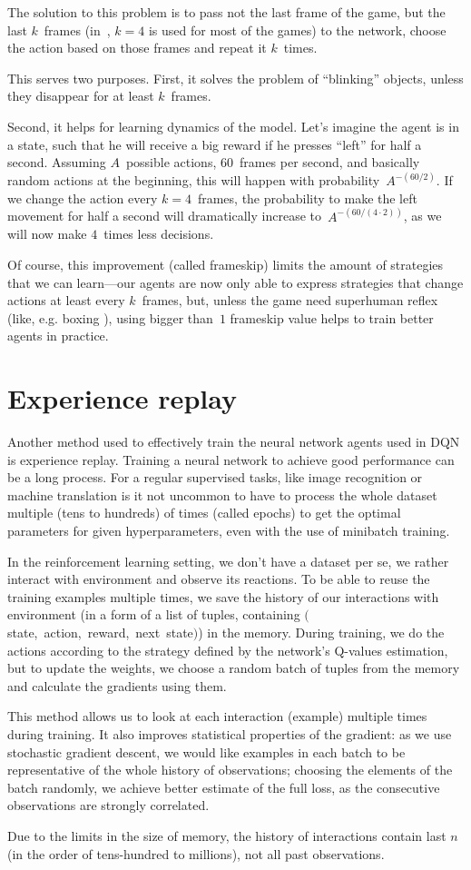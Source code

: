 The solution to this problem is to pass not the last frame of the game, but the last $k$~frames (in~\cite{nips-dqn}, $k=4$ is used for most of the games) to the network, choose the action based on those frames and repeat it $k$~times.

This serves two purposes. First, it solves the problem of ``blinking'' objects, unless they disappear for at least $k$~frames.

Second, it helps for learning dynamics of the model. Let's imagine the agent is in a state, such that he will receive a big reward if he presses ``left'' for half a second. Assuming $A$~possible actions, $60$~frames per second, and basically random actions at the beginning, this will happen with probability~$A^{-(60 / 2)}$. If we change the action every $k=4$~frames, the probability to make the left movement for half a second will dramatically increase to~$A^{-(60/(4 \cdot 2))}$, as we will now make $4$~times less decisions.

Of course, this improvement (called frameskip) limits the amount of strategies that we can learn---our agents are now only able to express strategies that change actions at least every $k$~frames, but, unless the game need superhuman reflex (like, e.g. boxing ), using bigger than~$1$ frameskip value helps to train better agents in practice.

\section{Experience replay}\label{experience-replay}
Another method used to effectively train the neural network agents used in DQN is experience replay. Training a neural network to achieve good performance can be a long process. For a regular supervised tasks, like image recognition or machine translation is it not uncommon to have to process the whole dataset multiple (tens to hundreds) of times (called epochs) to get the optimal parameters for given hyperparameters, even with the use of minibatch training.

In the reinforcement learning setting, we don't have a dataset per se, we rather interact with environment and observe its reactions. To be able to reuse the training examples multiple times, we save the history of our interactions with environment (in a form of a list of tuples, containing $($state,~action,~reward,~next~state$)$) in the memory. During training, we do the actions according to the strategy defined by the network's Q-values estimation, but to update the weights, we choose a random batch of tuples from the memory and calculate the gradients using them.

This method allows us to look at each interaction (example) multiple times during training. It also improves statistical properties of the gradient: as we use stochastic gradient descent, we would like examples in each batch to be representative of the whole history of observations; choosing the elements of the batch randomly, we achieve better estimate of the full loss, as the consecutive observations are strongly correlated.

Due to the limits in the size of memory, the history of interactions contain last $n$ (in the order of tens-hundred to millions), not all past observations.
